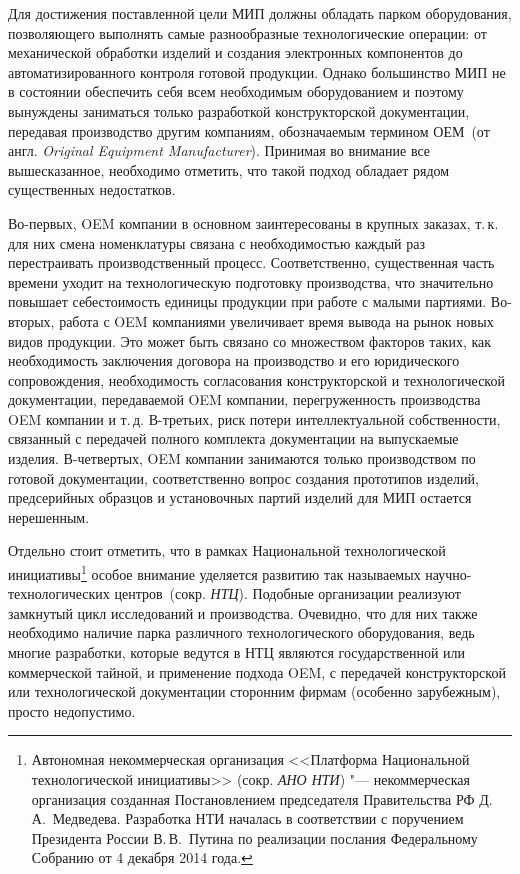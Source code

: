Для достижения поставленной цели МИП должны обладать парком оборудования, позволяющего выполнять самые разнообразные технологические операции: от механической обработки изделий и создания электронных компонентов до автоматизированного контроля готовой продукции. Однако большинство МИП не в состоянии обеспечить себя всем необходимым оборудованием и поэтому вынуждены заниматься только разработкой конструкторской документации, передавая производство другим компаниям, обозначаемым термином ОЕМ~(от англ. \textit{Original Equipment Manufacturer}). Принимая во внимание все вышесказанное, необходимо отметить, что такой подход обладает рядом существенных недостатков.

Во-первых, OEM компании в основном заинтересованы в крупных заказах, т.\,к. для них смена номенклатуры связана с необходимостью каждый раз перестраивать производственный процесс. Соответственно, существенная часть времени уходит на технологическую подготовку производства, что значительно повышает себестоимость единицы продукции при работе с малыми партиями. Во-вторых, работа с OEM компаниями увеличивает время вывода на рынок новых видов продукции. Это может быть связано со множеством факторов таких, как необходимость заключения договора на производство и его юридического сопровождения, необходимость согласования конструкторской и технологической документации, передаваемой OEM компании, перегруженность производства OEM компании и т.\,д. В-третьих, риск потери интеллектуальной собственности, связанный с передачей полного комплекта документации на выпускаемые изделия. В-четвертых, OEM компании занимаются только производством по готовой документации, соответственно вопрос создания прототипов изделий, предсерийных образцов и установочных партий изделий для МИП остается нерешенным.

Отдельно стоит отметить, что в рамках Национальной технологической инициативы\footnote{Автономная некоммерческая организация <<Платформа Национальной технологической инициативы>> (сокр. \textit{АНО НТИ}) "--- некоммерческая организация созданная Постановлением председателя Правительства РФ Д.\,А.~Медведева. Разработка НТИ началась в соответствии с поручением Президента России В.\,В.~Путина по реализации послания Федеральному Собранию от 4 декабря 2014 года.} особое внимание уделяется развитию так называемых научно-технологических центров~(сокр. \textit{НТЦ}). Подобные организации реализуют замкнутый цикл исследований и производства. Очевидно, что для них также необходимо наличие парка различного технологического оборудования, ведь многие разработки, которые ведутся в НТЦ являются государственной или коммерческой тайной, и применение подхода OEM, с передачей конструкторской или технологической документации сторонним фирмам (особенно зарубежным), просто недопустимо.  

